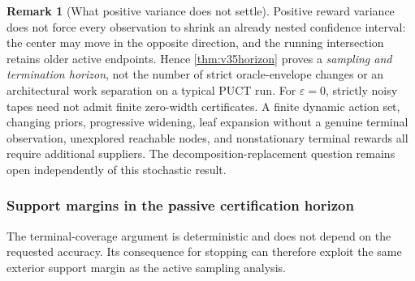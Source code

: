\documentclass{article}
\theoremstyle{plain}
\theoremstyle{definition}
\newtheorem{remark}[theorem]{Remark}
\begin{document}
\begin{remark}[What positive variance does not settle]
\label{rem:v35limits}
Positive reward variance does not force every observation to shrink
an already nested confidence interval: the center may move in the
opposite direction, and the running intersection retains older active
endpoints. Hence \cref{thm:v35horizon} proves a \emph{sampling and
termination horizon}, not the number of strict oracle-envelope
changes or an architectural work separation on a typical PUCT run.
For $\varepsilon=0$, strictly noisy tapes need not admit finite
zero-width certificates. A finite dynamic action set, changing priors,
progressive widening, leaf expansion without a genuine terminal
observation, unexplored reachable nodes, and nonstationary terminal
rewards all require additional suppliers. The decomposition-replacement
question remains open independently of this stochastic result.
\end{remark}


\subsubsection{Support margins in the passive certification horizon}
\label{app:puct-support-margin}
The terminal-coverage argument is deterministic and does not depend on the
requested accuracy. Its consequence for stopping can therefore exploit the
same exterior support margin as the active sampling analysis.
\end{document}
